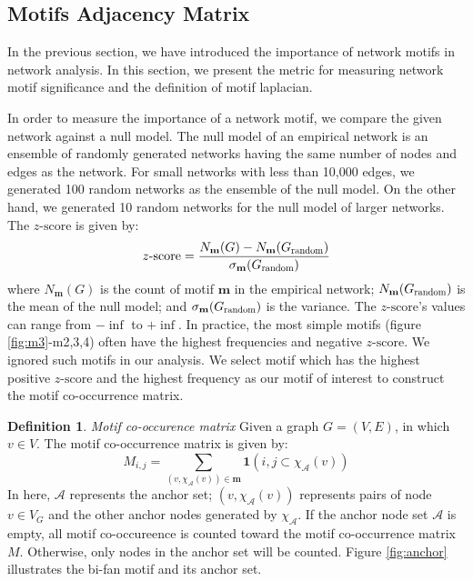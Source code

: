 \documentclass{article}
\theoremstyle{definition}
\newtheorem{definition}{Definition}[section]
\begin{document}
\subsection{Motifs Adjacency Matrix}

In the previous section, we have introduced the importance of
network motifs in network analysis. In this section, we present
the metric for measuring network motif significance and the definition
of motif laplacian.

In order to measure the importance of a network motif, we compare
the given network against a null model. The null model of an empirical 
network 
is an ensemble of randomly generated networks having the same number of nodes and
edges as the network. For small networks with less than 10,000 edges, we
generated 100 random networks as the ensemble of the null model. On the other
hand, we generated 10 random networks for the null model of larger networks.
The $z\mbox{-score}$ is given by:
\begin{equation*}
z\mbox{-score} = \frac{N_\mathbf{m}(G)-N_\mathbf{m}(G_{\scalebox{0.75}{random}})}{\sigma_\mathbf{m}(G_{\scalebox{0.75}{random}})}
\end{equation*}
where $N_\mathbf{m}(G)$ is the count of motif $\mathbf{m}$ in the empirical
network; $N_\mathbf{m}(G_{\scalebox{0.75}{random}})$ is the mean of the
null model; and $\sigma_\mathbf{m}(G_{\scalebox{0.75}{random}})$ is the variance.
The $z\mbox{-score}$'s values can range from $-\inf$ to $+\inf$. In practice,
the most simple motifs (figure \ref{fig:m3}-m2,3,4) often have the highest
frequencies and negative $z\mbox{-score}$. We ignored such motifs in our analysis.
We select motif which has the highest positive $z\mbox{-score}$ and the highest frequency
as our motif of interest to construct the motif co-occurrence matrix.

\begin{definition} \emph{Motif co-occurence matrix}
Given a graph $G = (V,E)$, in which $v \in V$. The motif co-occurrence matrix
is given by:
$$M_{i,j} = \sum_{(v, \chi_{\mathcal{A}}(v)) \in \mathbf{m}} \mathbf{1}({i,j} \subset \chi_\mathcal{A}(v))$$
In here, $\mathcal{A}$ represents the anchor set; $(v, \chi_{\mathcal{A}}(v))$ 
represents pairs of node $v \in V_G$ and the other anchor nodes generated by $\chi_\mathcal{A}$.
If the anchor node set $\mathcal{A}$ is empty, all motif co-occureence is
counted toward the motif co-occurrence matrix $M$. Otherwise, only nodes in
the anchor set will be counted. Figure \ref{fig:anchor} illustrates
the bi-fan motif and its anchor set.
\end{definition}
\end{document}
